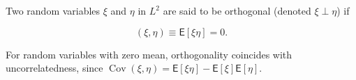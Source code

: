 Two random variables $\xi$ and $\eta$ in $L^2$ are said to be orthogonal (denoted $\xi \perp \eta$) if

$$(\xi, \eta) \equiv \mathsf{E}[\xi \eta] = 0.$$

For random variables with zero mean, orthogonality coincides with uncorrelatedness, since $\operatorname{Cov}(\xi, \eta) = \mathsf{E}[\xi \eta] - \mathsf{E}[\xi]\mathsf{E}[\eta]$.
